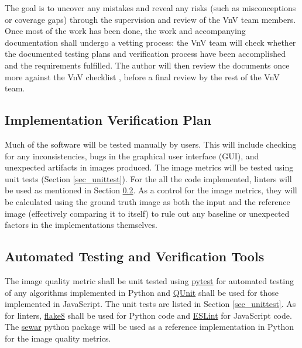 \documentclass[12pt, titlepage]{article}
\begin{document}
The goal is to uncover any mistakes and reveal any risks (such as misconceptions or coverage gaps) 
through the supervision and 
review of the VnV team members. Once most of the work has been done, the work and
accompanying documentation shall undergo a vetting process: the VnV team
will check whether the documented testing plans and verification process have been 
accomplished and the requirements fulfilled. The author will then review the documents once more
against the VnV checklist \citep{VnV_checklist}, before a final review by the rest of the VnV team.

\subsection{Implementation Verification Plan}  \label{sec_impl_vplan}

Much of the software will be tested manually by users. This will include checking for
any inconsistencies, bugs in the graphical user interface (GUI), and unexpected
artifacts in images produced.
The image metrics will be tested using unit tests (Section \ref{sec_unittest}). For the
all the code implemented, linters will be used as mentioned in Section \ref{sec_autotest_tools}.
As a control for the image metrics, they will be calculated using the ground truth image as both the 
input and the reference image (effectively comparing it to itself) 
to rule out any baseline or unexpected factors in the implementations themselves.


\subsection{Automated Testing and Verification Tools} \label{sec_autotest_tools}

The image quality metric shall be unit tested using \href{https://pytest.org}{pytest} for 
automated testing of any algorithms implemented in Python and \href{https://qunitjs.com}{QUnit} 
shall be used for those implemented in JavaScript. The unit tests are listed in 
Section \ref{sec_unittest}.
As for linters, \href{https://flake8.pycqa.org}{flake8} shall be used for Python code 
and \href{https://eslint.org}{ESLint} for JavaScript code.
The \href{https://github.com/andrewekhalel/sewar}{sewar} python package will be 
used as a reference implementation in Python for the image quality metrics.
\end{document}

